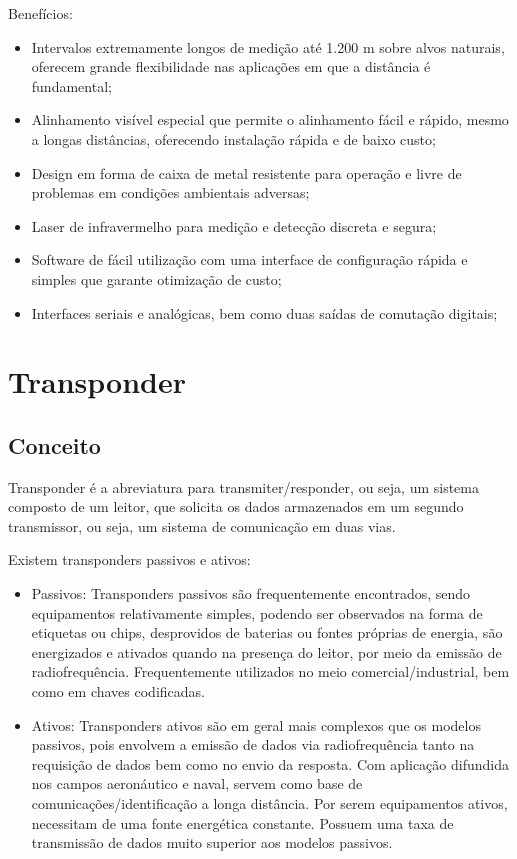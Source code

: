 Benefícios:
\begin{itemize}
	\item Intervalos extremamente longos de medição até 1.200 m sobre alvos naturais, oferecem grande flexibilidade nas aplicações em que a distância é fundamental;

	\item Alinhamento visível especial que permite o alinhamento fácil e rápido, mesmo a longas distâncias, oferecendo instalação rápida e de baixo custo;

	\item Design em forma de caixa de metal resistente para operação e livre de problemas em condições ambientais adversas;

	\item Laser de infravermelho para medição e detecção discreta e segura;
	\item Software de fácil utilização com uma interface de configuração rápida e simples que garante otimização de custo;
	\item Interfaces seriais e analógicas, bem como duas saídas de comutação digitais;
\end{itemize}

\section{Transponder}
\label{sec:Transponder}
\subsection{Conceito}
\label{sub:Conceito}

Transponder é a abreviatura para transmiter/responder, ou seja, um sistema composto de um leitor, que solicita os dados armazenados em um segundo transmissor, ou seja, um sistema de comunicação em duas vias.

Existem transponders passivos e ativos:

\begin{itemize}
  \item Passivos: Transponders passivos são frequentemente encontrados, sendo equipamentos relativamente simples, podendo ser observados na forma de etiquetas ou chips, desprovidos de baterias ou fontes próprias de energia, são energizados e ativados quando na presença do leitor, por meio da emissão de radiofrequência. Frequentemente utilizados no meio comercial/industrial, bem como em chaves codificadas.
  \item Ativos: Transponders ativos são em geral mais complexos que os modelos passivos, pois envolvem a emissão de dados via radiofrequência tanto na requisição de dados bem como no envio da resposta. Com aplicação difundida nos campos aeronáutico e naval, servem como base de comunicações/identificação a longa distância. Por serem equipamentos ativos, necessitam de uma fonte energética constante. Possuem uma taxa de transmissão de dados muito superior aos modelos passivos.
\end{itemize}


